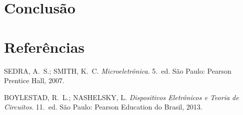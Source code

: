 \documentclass[11pt,a4paper]{article}
\begin{document}




\section{Conclusão}


\section{Referências}

\begin{referencias}
\item SEDRA, A.~S.; SMITH, K.~C. \emph{Microeletrônica}. 5.~ed. São Paulo: Pearson
      Prentice Hall, 2007.
\item BOYLESTAD, R.~L.; NASHELSKY, L. \emph{Dispositivos Eletrônicos e Teoria de
      Circuitos}. 11.~ed. São Paulo: Pearson Education do Brasil, 2013.
\end{referencias}
\end{document}
